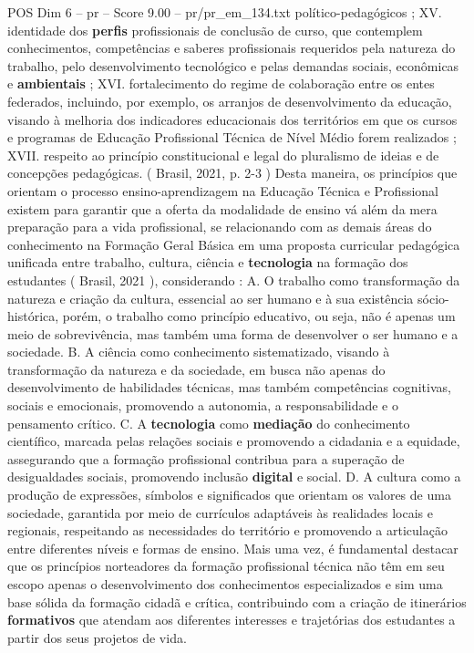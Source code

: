 \begin{textsample}{POS Dim 6 – pr – Score 9.00 – pr/pr\_em\_134.txt}
político-pedagógicos ; XV. identidade dos \textbf{perfis} profissionais de conclusão de curso, que contemplem conhecimentos, competências e saberes profissionais requeridos pela natureza do trabalho, pelo desenvolvimento tecnológico e pelas demandas sociais, econômicas e \textbf{ambientais} ; XVI. fortalecimento do regime de colaboração entre os entes federados, incluindo, por exemplo, os arranjos de desenvolvimento da educação, visando à melhoria dos indicadores educacionais dos territórios em que os cursos e programas de Educação Profissional Técnica de Nível Médio forem realizados ; XVII. respeito ao princípio constitucional e legal do pluralismo de ideias e de concepções pedagógicas. ( Brasil, 2021, p. 2-3 ) Desta maneira, os princípios que orientam o processo ensino-aprendizagem na Educação Técnica e Profissional existem para garantir que a oferta da modalidade de ensino vá além da mera preparação para a vida profissional, se relacionando com as demais áreas do conhecimento na Formação Geral Básica em uma proposta curricular pedagógica unificada entre trabalho, cultura, ciência e \textbf{tecnologia} na formação dos estudantes ( Brasil, 2021 ), considerando : A.
O trabalho como transformação da natureza e criação da cultura, essencial ao ser humano e à sua existência sócio-histórica, porém, o trabalho como princípio educativo, ou seja, não é apenas um meio de sobrevivência, mas também uma forma de desenvolver o ser humano e a sociedade.
B.
A ciência como conhecimento sistematizado, visando à transformação da natureza e da sociedade, em busca não apenas do desenvolvimento de habilidades técnicas, mas também competências cognitivas, sociais e emocionais, promovendo a autonomia, a responsabilidade e o pensamento crítico.
C.
A \textbf{tecnologia} como \textbf{mediação} do conhecimento científico, marcada pelas relações sociais e promovendo a cidadania e a equidade, assegurando que a formação profissional contribua para a superação de desigualdades sociais, promovendo inclusão \textbf{digital} e social.
D.
A cultura como a produção de expressões, símbolos e significados que orientam os valores de uma sociedade, garantida por meio de currículos adaptáveis às realidades locais e regionais, respeitando as necessidades do território e promovendo a articulação entre diferentes níveis e formas de ensino.
Mais uma vez, é fundamental destacar que os princípios norteadores da formação profissional técnica não têm em seu escopo apenas o desenvolvimento dos conhecimentos especializados e sim uma base sólida da formação cidadã e crítica, contribuindo com a criação de itinerários \textbf{formativos} que atendam aos diferentes interesses e trajetórias dos estudantes a partir dos seus projetos de vida.

\end{textsample}
